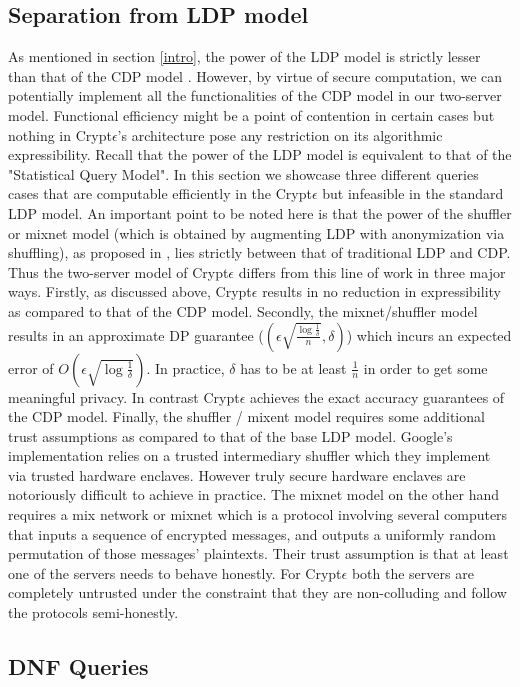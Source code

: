 \subsection{Separation from LDP model}
As mentioned in section \ref{intro}, the power of the LDP model is strictly lesser than that of the CDP model \cite{Kasivi,mixnets}. However, by virtue of secure computation, we can potentially implement all the functionalities of the CDP model in our two-server model. Functional efficiency might be a point of contention in certain cases but nothing in Crypt$\epsilon$'s architecture pose any  restriction on its algorithmic expressibility. Recall that the power of the LDP model is equivalent to that of the "Statistical Query Model". In this section we showcase three different queries cases that are computable efficiently in the Crypt$\epsilon$ but infeasible in the standard LDP model. 
An important point to be noted here is that the power of the shuffler or mixnet model  (which is obtained by augmenting LDP with anonymization via shuffling), as proposed in \cite{Prochlo, mixnets,amplification},  lies strictly between that of traditional LDP and CDP. Thus the two-server model of Crypt$\epsilon$ differs from this line of work in three major ways. Firstly, as discussed above, Crypt$\epsilon$ results in no reduction in expressibility as compared to that of the CDP model. Secondly, the mixnet/shuffler model results in an approximate DP guarantee ($(\epsilon\sqrt{\frac{\log\frac{1}{\delta}}{n}},\delta)$) which incurs an expected error of $O(\epsilon\sqrt{\log\frac{1}{\delta}})$.  In practice, $\delta$ has to be at least $\frac{1}{n}$ in order to get some meaningful privacy. In contrast Crypt$\epsilon$ achieves the exact accuracy guarantees of the CDP model. Finally, the shuffler / mixent model requires some additional trust assumptions as compared to that of the base LDP model. Google's implementation relies on a trusted intermediary shuffler which they implement via trusted hardware enclaves. However truly secure hardware enclaves are notoriously difficult to achieve in practice. The mixnet model on the other hand requires a  mix network or mixnet which is a protocol involving several computers that inputs a sequence
of encrypted messages, and outputs a uniformly random permutation of those messages’ plaintexts.  Their trust assumption is that at least one of the servers needs to behave honestly. For Crypt$\epsilon$ both the servers are completely untrusted under the constraint that they are non-colluding and follow the protocols semi-honestly. \subsection*{DNF Queries}
